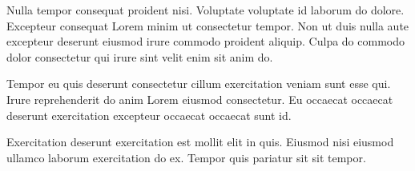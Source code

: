 Nulla tempor consequat proident nisi. Voluptate voluptate id laborum do dolore. Excepteur consequat Lorem minim ut consectetur tempor. Non ut duis nulla aute excepteur deserunt eiusmod irure commodo proident aliquip. Culpa do commodo dolor consectetur qui irure sint velit enim sit anim do.

Tempor eu quis deserunt consectetur cillum exercitation veniam sunt esse qui. Irure reprehenderit do anim Lorem eiusmod consectetur. Eu occaecat occaecat deserunt exercitation excepteur occaecat occaecat sunt id.

Exercitation deserunt exercitation est mollit elit in quis. Eiusmod nisi eiusmod ullamco laborum exercitation do ex. Tempor quis pariatur sit sit tempor.
